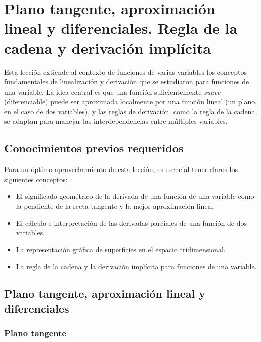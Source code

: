 
\section{Plano tangente, aproximación lineal y diferenciales. Regla de la cadena y derivación implícita}

\begin{rem}
Esta lección extiende al contexto de funciones de varias variables los conceptos fundamentales de linealización y derivación que se estudiaron para funciones de una variable. La idea central es que una función suficientemente \emph{suave} (diferenciable) puede ser aproximada localmente por una función lineal (un plano, en el caso de dos variables), y las reglas de derivación, como la regla de la cadena, se adaptan para manejar las interdependencias entre múltiples variables.
\end{rem}

\subsection{Conocimientos previos requeridos}

Para un óptimo aprovechamiento de esta lección, es esencial tener claros los siguientes conceptos:
\begin{itemize}
    \item El significado geométrico de la derivada de una función de una variable como la pendiente de la recta tangente y la mejor aproximación lineal.
    \item El cálculo e interpretación de las derivadas parciales de una función de dos variables.
    \item La representación gráfica de superficies en el espacio tridimensional.
    \item La regla de la cadena y la derivación implícita para funciones de una variable.
\end{itemize}

\subsection{Plano tangente, aproximación lineal y diferenciales}

\subsubsection{Plano tangente}

